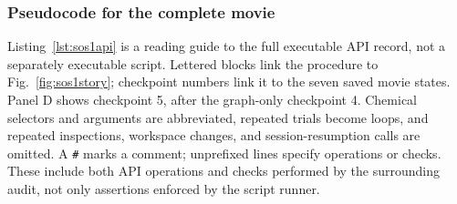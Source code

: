 \subsubsection{Pseudocode for the complete movie}

Listing~\ref{lst:sos1api} is a reading guide to the full executable API record, not a separately executable script. Lettered blocks link the procedure to Fig.~\ref{fig:sos1story}; checkpoint numbers link it to the seven saved movie states. Panel D shows checkpoint 5, after the graph-only checkpoint 4. Chemical selectors and arguments are abbreviated, repeated trials become loops, and repeated inspections, workspace changes, and session-resumption calls are omitted. A \texttt{\#} marks a comment; unprefixed lines specify operations or checks. These include both API operations and checks performed by the surrounding audit, not only assertions enforced by the script runner.

\begingroup
{}
\newcommand{\sosstage}[4]{%
  \par\vspace{0.55em}\noindent
  {\bfseries\color{#1}#2\quad #3}\par
  {\small #4}\par\vspace{-0.35em}}

